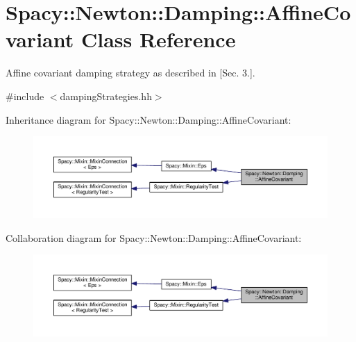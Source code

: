 \hypertarget{classSpacy_1_1Newton_1_1Damping_1_1AffineCovariant}{}\section{Spacy\+:\+:Newton\+:\+:Damping\+:\+:Affine\+Covariant Class Reference}
\label{classSpacy_1_1Newton_1_1Damping_1_1AffineCovariant}


Affine covariant damping strategy as described in \cite{Deuflhard2004} \mbox{[}Sec. 3.\mbox{]}.  




{\ttfamily \#include $<$damping\+Strategies.\+hh$>$}



Inheritance diagram for Spacy\+:\+:Newton\+:\+:Damping\+:\+:Affine\+Covariant\+:
\nopagebreak
\begin{figure}[H]
\begin{center}
\leavevmode
\includegraphics[width=350pt]{classSpacy_1_1Newton_1_1Damping_1_1AffineCovariant__inherit__graph}
\end{center}
\end{figure}


Collaboration diagram for Spacy\+:\+:Newton\+:\+:Damping\+:\+:Affine\+Covariant\+:
\nopagebreak
\begin{figure}[H]
\begin{center}
\leavevmode
\includegraphics[width=350pt]{classSpacy_1_1Newton_1_1Damping_1_1AffineCovariant__coll__graph}
\end{center}
\end{figure}

